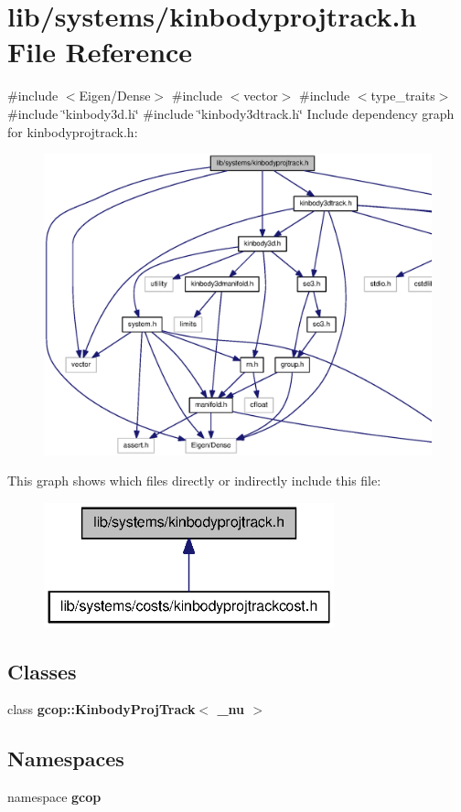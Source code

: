 \section{lib/systems/kinbodyprojtrack.h \-File \-Reference}
\label{kinbodyprojtrack_8h}
{\ttfamily \#include $<$\-Eigen/\-Dense$>$}\*
{\ttfamily \#include $<$vector$>$}\*
{\ttfamily \#include $<$type\-\_\-traits$>$}\*
{\ttfamily \#include \char`\"{}kinbody3d.\-h\char`\"{}}\*
{\ttfamily \#include \char`\"{}kinbody3dtrack.\-h\char`\"{}}\*
\-Include dependency graph for kinbodyprojtrack.\-h\-:
\nopagebreak
\begin{figure}[H]
\begin{center}
\leavevmode
\includegraphics[width=350pt]{kinbodyprojtrack_8h__incl}
\end{center}
\end{figure}
\-This graph shows which files directly or indirectly include this file\-:
\nopagebreak
\begin{figure}[H]
\begin{center}
\leavevmode
\includegraphics[width=238pt]{kinbodyprojtrack_8h__dep__incl}
\end{center}
\end{figure}
\subsection*{\-Classes}
\begin{DoxyCompactItemize}
\item 
class {\bf gcop\-::\-Kinbody\-Proj\-Track$<$ \-\_\-nu $>$}
\end{DoxyCompactItemize}
\subsection*{\-Namespaces}
\begin{DoxyCompactItemize}
\item 
namespace {\bf gcop}
\end{DoxyCompactItemize}
